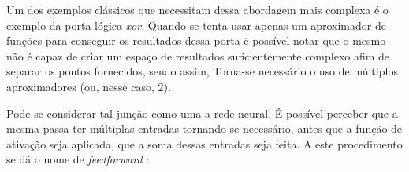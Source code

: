 \begin{apendicesenv}
		\par Um dos exemplos clássicos que necessitam dessa abordagem mais complexa é o exemplo da porta lógica \textit{xor}. Quando se tenta usar apenas um aproximador de funções para conseguir os resultados dessa porta é possível notar que o mesmo não é capaz de criar um espaço de resultados suficientemente complexo afim de separar os pontos fornecidos, sendo assim, Torna-se necessário o uso de múltiplos aproximadores (ou, nesse caso, 2).
		
		\par Pode-se considerar tal junção como uma a rede neural. É possível perceber que a mesma passa ter múltiplas entradas tornando-se necessário, antes que a função de ativação seja aplicada, que a soma dessas entradas seja feita. A este procedimento se dá o nome de \textit{feedforward} \cite{haykinredes}:
		
		
		
\end{apendicesenv}









